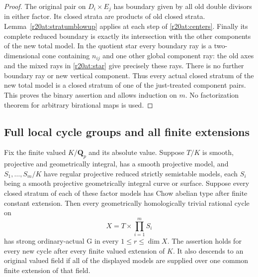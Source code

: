 \begin{proof}
The original pair on $D_i\times E_j$ has boundary given by all
old double divisors in either factor.  Its closed strata are
products of old closed strata.  Lemma~\ref{r20at:stratumblowup}
applies at each step of \eqref{r20at:centers}.
Finally its complete reduced boundary is exactly its intersection
with the other components of the new total model.  In the quotient
star every boundary ray is a two-dimensional cone containing
$n_{ij}$ and one other global component ray: the old axes and
the mixed rays in \eqref{r20at:star} give precisely these rays.
There is no further boundary ray or new vertical component.
Thus every actual closed stratum of the new total model is a
closed stratum of one of the just-treated component pairs.
This proves the binary assertion and allows induction on $m$.
No factorization theorem for arbitrary birational maps is used.
\end{proof}

\subsection{Full local cycle groups and all finite extensions}

\begin{theorem}
\label{r20at:local}
Fix the finite valued $K/\mathbf Q_p$ and its absolute value.
Suppose $T/K$ is smooth, projective and geometrically integral,
has a smooth projective model, and
$S_1,\ldots,S_m/K$ have regular projective reduced strictly
semistable models, each $S_i$ being a smooth projective
geometrically integral curve or surface.  Suppose every closed
stratum of each of these factor models has Chow abelian type
after finite constant extension.  Then every geometrically
homologically trivial rational cycle on
\[
                         X=T\times\prod_{i=1}^mS_i
 \tag{AT20.9}\label{r20at:genericproduct}
\]
has strong ordinary-actual G in every $1\le r\le\dim X$.
The assertion holds for every new cycle after every finite valued
extension of $K$.  It also descends to an original valued field
if all of the displayed models are supplied over one common
finite extension of that field.
\end{theorem}

